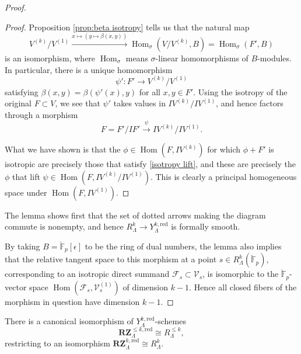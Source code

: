 \documentclass[11pt]{alggeom}
\newcommand{\map}[1]{\xrightarrow{#1}}
\newcommand{\iso}{\cong}
\newcommand{\red}{\mathrm{red}}
\newcommand{\F}{\mathbb F}
\DeclareMathOperator{\Hom}{Hom}
\begin{document}
\begin{proof}
\begin{proof}
Proposition \ref{prop:beta isotropy} tells us that the natural map
\[
V^{(k)}/ V^{(1)}  \map{ x \mapsto ( y \mapsto \beta(x, y) ) } 
 \Hom_\sigma(  V /  V^{(k)}   , B )
 =  \Hom_\sigma(  F'  , B )
\]
is an isomorphism, where $\Hom_\sigma$ means $\sigma$-linear homomorphisms of $B$-modules.
In particular, there is a unique homomorphism
\[
\psi' : F' \to  V^{(k)}/ V^{(1)} 
\]
satisfying
$
\beta(x,y) =\beta(\psi'(x),y)
$
for all $x,y\in F'$.  Using the isotropy of the original $F \subset V$, we see that $\psi'$ takes values in 
$IV^{(k)}/IV^{(1)}$, and hence factors through a morphism
\[
F= F'/IF'  \map{\psi} IV^{(k)}/IV^{(1)}.
\]

What we have shown is that the $\phi \in \Hom(F, I V^{(k)}  )$ for which $\phi+F'$ is isotropic are precisely those that satisfy \eqref{isotropy lift}, and these are precisely the $\phi$ that lift $\psi \in \Hom(F, I V^{(k)} /IV^{(1)} )$.  This is clearly a principal homogeneous space under 
$\Hom(F,  IV^{(1)} )$.
\end{proof}


The lemma shows first that the set of dotted arrows making the diagram commute is nonempty, and hence 
 $R_\Lambda^k \to Y^{k,\red}_\Lambda$ is formally smooth.  
 
 By taking $B=\breve{\F}_p[\epsilon]$ to be the ring of dual numbers, the lemma also implies that the relative tangent space to this morphism at a point $s\in  R_\Lambda^k (\breve{\F}_p)$, corresponding to an isotropic direct summand $\mathscr{F}_s \subset \mathscr{V}_s$, is isomorphic to the $\breve{\F}_p$-vector space $\Hom( \mathscr{F}_s,  \mathscr{V}^{(1)}_s)$ of dimension $k-1$.  Hence all  closed fibers of the morphism in question have dimension $k-1$.
\end{proof}


\begin{theorem}\label{thm:enhanced structure}
There is a canonical isomorphism of $Y_\Lambda^{k,\red}$-schemes
\[
\mathbf{RZ}_\Lambda^{ \le k,\red} \iso R^{\le k}_\Lambda,
\]
restricting to an isomorphism
 $
 \mathbf{RZ}^{k,\red}_\Lambda \iso R^{k}_\Lambda .
 $
\end{theorem}
\end{document}
